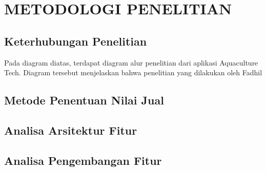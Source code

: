 
\chapter{METODOLOGI PENELITIAN}

\section{Keterhubungan Penelitian}

Pada diagram diatas, terdapat diagram alur penelitian dari aplikasi Aquaculture Tech. Diagram tersebut menjelaskan bahwa penelitian yang dilakukan oleh Fadhil \citep{fadhil2022}

\section{Metode Penentuan Nilai Jual}

\section{Analisa Arsitektur Fitur}

\section{Analisa Pengembangan Fitur}






